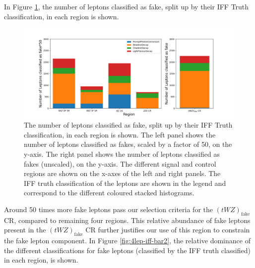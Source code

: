 In Figure \ref{fig:4lep-iff-bar1}, the number of leptons classified as fake, split up by their IFF Truth classification, in each region is shown.

\begin{figure}[htbp]
\centering

    \includegraphics[width=.6\textwidth]{figures/iff_bar_1.png}   

    \caption{The number of leptons classified as fake, split up by their IFF Truth classification, in each region is shown. The left panel shows the number of leptons classified as fakes, scaled by a factor of 50, on the y-axis. The right panel shows the number of leptons classified as fakes (unscaled), on the y-axis. The different signal and control regions are shown on the x-axes of the left and right panels. The IFF truth classification of the leptons are shown in the legend and correspond to the different coloured stacked histograms.}
  \label{fig:4lep-iff-bar1}
\end{figure}

Around 50 times more fake leptons pass our selection criteria for the $(tWZ)_{\text{fake}}$ CR, compared to remaining four regions. This relative abundance of fake leptons present in the $(tWZ)_{\text{fake}}$ CR further justifies our use of this region to constrain the fake lepton component. In Figure \ref{fig:4lep-iff-bar2}, the relative dominance of the different classifications for fake leptons (classified by the IFF truth classified) in each region, is shown.

